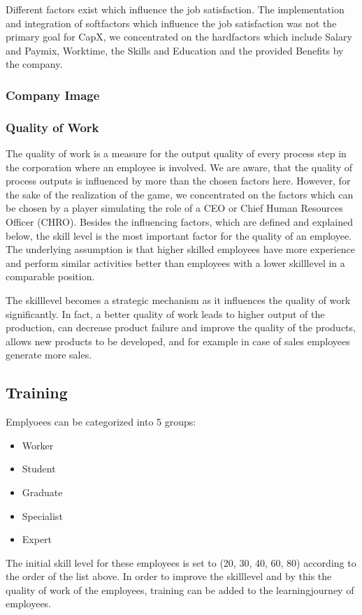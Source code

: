 Different factors exist which influence the job satisfaction. \cite{Kapur} The implementation and integration of softfactors which influence the job satisfaction was not the primary goal for CapX, we concentrated on the hardfactors which include Salary and Paymix, Worktime, the Skills and Education and the provided Benefits by the company. 

\subsubsection{Company Image}

\subsubsection{Quality of Work}
The quality of work is a measure for the output quality of every process step in the corporation where an employee is involved. We are aware, that the quality of process outputs is influenced by more than the chosen factors here. However, for the sake of the realization of the game, we concentrated on the factors which can be chosen by a player simulating the role of a CEO or Chief Human Resources Officer (CHRO). Besides the influencing factors, which are defined and explained below, the skill level is the most important factor for the quality of an employee. The underlying assumption is that higher skilled employees have more experience and perform similar activities better than employees with a lower skilllevel in a comparable position.

The skilllevel becomes a strategic mechanism as it influences the quality of work significantly. In fact, a better quality of work leads to higher output of the production, can decrease product failure and improve the quality of the products, allows new products to be developed, and for example in case of sales employees generate more sales.


\subsection{Training}
Emplyoees can be categorized into 5 groups:
\begin{itemize}
    \item Worker
    \item Student
    \item Graduate
    \item Specialist
    \item Expert
\end{itemize}
The initial skill level for these employees is set to (20, 30, 40, 60, 80) according to the order of the list above. In order to improve the skilllevel and by this the quality of work of the employees, training can be added to the learningjourney of employees. 

